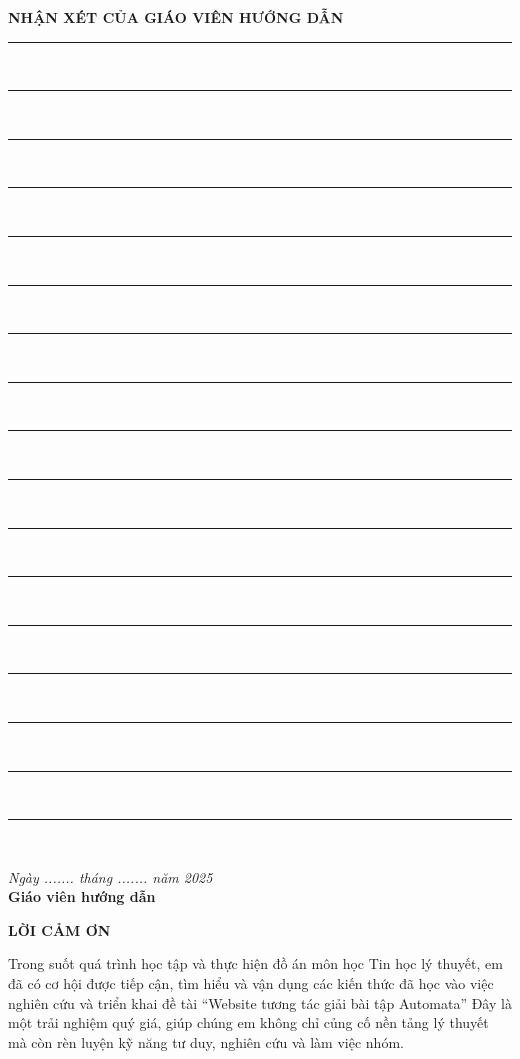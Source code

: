 \documentclass[12pt,a4paper]{report}
\begin{document}
\begin{center}
    {\Large\bf NHẬN XÉT CỦA GIÁO VIÊN HƯỚNG DẪN}\\[1.5cm]
\end{center}

\vspace{1cm}

\noindent\rule{15cm}{0.4pt}\\[0.5cm]
\noindent\rule{15cm}{0.4pt}\\[0.5cm]
\noindent\rule{15cm}{0.4pt}\\[0.5cm]
\noindent\rule{15cm}{0.4pt}\\[0.5cm]
\noindent\rule{15cm}{0.4pt}\\[0.5cm]
\noindent\rule{15cm}{0.4pt}\\[0.5cm]
\noindent\rule{15cm}{0.4pt}\\[0.5cm]
\noindent\rule{15cm}{0.4pt}\\[0.5cm]
\noindent\rule{15cm}{0.4pt}\\[0.5cm]
\noindent\rule{15cm}{0.4pt}\\[0.5cm]
\noindent\rule{15cm}{0.4pt}\\[0.5cm]
\noindent\rule{15cm}{0.4pt}\\[0.5cm]
\noindent\rule{15cm}{0.4pt}\\[0.5cm]
\noindent\rule{15cm}{0.4pt}\\[0.5cm]
\noindent\rule{15cm}{0.4pt}\\[0.5cm]
\noindent\rule{15cm}{0.4pt}\\[0.5cm]
\noindent\rule{15cm}{0.4pt}\\[0.5cm]

\vfill


\begin{flushright}
    \textit{Ngày ....... tháng ....... năm 2025}\\
    \textbf{Giáo viên hướng dẫn}\\[2cm]
\end{flushright}

\newpage
{}
\begin{center}
    {\Large\textbf{LỜI CẢM ƠN}}
\end{center}
\vspace{1cm}

\justifying
Trong suốt quá trình học tập và thực hiện đồ án môn học Tin học lý thuyết, em đã có cơ hội được tiếp cận, tìm hiểu và vận dụng các kiến thức đã học vào việc nghiên cứu và triển khai đề tài “Website tương tác giải bài tập Automata” Đây là một trải nghiệm quý giá, giúp chúng em không chỉ củng cố nền tảng lý thuyết mà còn rèn luyện kỹ năng tư duy, nghiên cứu và làm việc nhóm.
\end{document}
